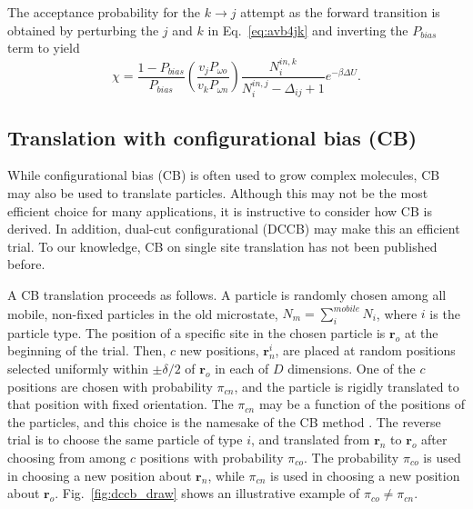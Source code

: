 \documentclass[
  9pt,
  bestpractices,
]{livecoms}
\begin{document}
The acceptance probability for the $k\rightarrow j$ attempt as the forward transition is obtained by perturbing the $j$ and $k$ in Eq.~\ref{eq:avb4jk} and inverting the $P_{bias}$ term to yield
\begin{equation}
\chi = \frac{1-P_{bias}}{P_{bias}}\left(\frac{v_j P_{\omega o}}{v_k P_{\omega n}}\right)\frac{N_i^{in,k}}{N_i^{in,j} - \Delta_{ij} + 1}e^{-\beta \Delta U}.
\label{eq:avb3inin}
\end{equation}


\subsection{\label{sec:lhs_disp_cb}Translation with configurational bias (CB)}

While configurational bias (CB) is often used to grow complex molecules, CB may also be used to translate particles.
Although this may not be the most efficient choice for many applications, it is instructive to consider how CB is derived.
In addition, dual-cut configurational (DCCB) \cite{vlugt_improving_1998} may make this an efficient trial.
To our knowledge, CB on single site translation has not been published before.

A CB translation proceeds as follows.
A particle is randomly chosen among all mobile, non-fixed particles in the old microstate, $N_m=\sum_i^{mobile} N_i$, where $i$ is the particle type.
The position of a specific site in the chosen particle is $\mathbf{r}_o$ at the beginning of the trial.
Then, $c$ new positions, $\mathbf{r}_n^i$, are placed at random positions selected uniformly within $\pm\delta/2$ of $\mathbf{r}_o$ in each of $D$ dimensions.
One of the $c$ positions are chosen with probability $\pi_{cn}$, and the particle is rigidly translated to that position with fixed orientation.
The $\pi_{cn}$ may be a function of the positions of the particles, and this choice is the namesake of the CB method \cite{siepmann_configurational_1992}.
The reverse trial is to choose the same particle of type $i$, and translated from $\mathbf{r}_n$ to $\mathbf{r}_o$ after choosing from among $c$ positions with probability $\pi_{co}$.
The probability $\pi_{co}$ is used in choosing a new position about $\mathbf{r}_n$, while $\pi_{cn}$ is used in choosing a new position about $\mathbf{r}_o$.
Fig.~\ref{fig:dccb_draw} shows an illustrative example of $\pi_{co} \neq \pi_{cn}$.
\end{document}
